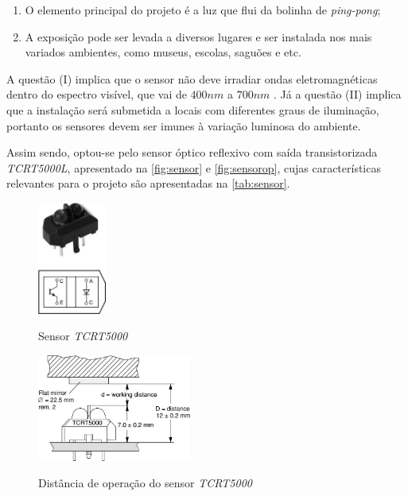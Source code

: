 \begin{enumerate}[label=\Roman*.]
    \item O elemento principal do projeto é a luz que flui da bolinha de \emph{ping-pong};
    \item A exposição pode ser levada a diversos lugares e ser instalada nos mais variados ambientes, como museus, escolas, saguões e etc.
\end{enumerate}

A questão (I) implica que o sensor não deve irradiar ondas eletromagnéticas dentro do espectro visível, que vai de $400nm$ a $700nm$ \cite{fundafisica}. Já a questão (II) implica que a instalação será submetida a locais com diferentes graus de iluminação, portanto os sensores devem ser imunes à variação luminosa do ambiente.

Assim sendo, optou-se pelo sensor óptico reflexivo com saída transistorizada \emph{TCRT5000L}, apresentado na \autoref{fig:sensor} e \autoref{fig:sensorop}, cujas características relevantes para o projeto são apresentadas na \autoref{tab:sensor}.

\begin{figure}[!htb]
    \centering
    \caption{Sensor \emph{TCRT5000}}
    \includegraphics[width=0.2\textwidth]{./dados/figuras/sensor}
    \label{fig:sensor}
\end{figure}

\begin{figure}[!htb]
    \centering
    \caption{Distância de operação do sensor \emph{TCRT5000}}
    \includegraphics[width=0.45\textwidth]{./dados/figuras/sensor-op}
    \label{fig:sensorop}
\end{figure}

